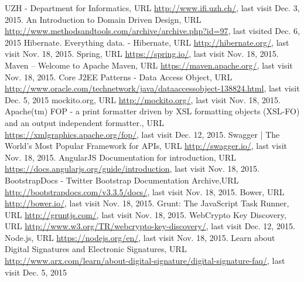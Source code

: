 \begin{thebibliography}{99}

 UZH - Department for Informatics, URL \url{http://www.ifi.uzh.ch/}, last visit Dec. 3, 2015.
 An Introduction to Domain Driven Design, URL \url{http://www.methodsandtools.com/archive/archive.php?id=97}, last visited Dec. 6, 2015
 Hibernate. Everything data. - Hibernate, URL \url{http://hibernate.org/}, last visit Nov. 18, 2015.
 Spring, URL \url{https://spring.io/}, last visit Nov. 18, 2015.
 Maven – Welcome to Apache Maven, URL \url{https://maven.apache.org/}, last visit Nov. 18, 2015.
 Core J2EE Patterns - Data Access Object, URL \url{http://www.oracle.com/technetwork/java/dataaccessobject-138824.html}, last visit Dec. 5, 2015
 mockito.org, URL \url{http://mockito.org/}, last visit Nov. 18, 2015.
 Apache(tm) FOP - a print formatter driven by XSL formatting objects (XSL-FO) and an output independent formatter., URL \url{https://xmlgraphics.apache.org/fop/}, last visit Dec. 12, 2015.
 Swagger | The World's Most Popular Framework for APIs, URL \url{http://swagger.io/}, last visit Nov. 18, 2015.
 AngularJS Documentation for introduction, URL \url{https://docs.angularjs.org/guide/introduction}, last visit Nov. 18, 2015.
 BootstrapDocs - Twitter Bootstrap Documentation Archive,\newline URL \url{http://bootstrapdocs.com/v3.3.5/docs/}, last visit Nov. 18, 2015.
 Bower, URL \url{http://bower.io/}, last visit Nov. 18, 2015.
 Grunt: The JavaScript Task Runner, URL \url{http://gruntjs.com/}, last visit Nov. 18, 2015.
 WebCrypto Key Discovery, URL \url{http://www.w3.org/TR/webcrypto-key-discovery/}, last visit Dec. 12, 2015.
 Node.js, URL \url{https://nodejs.org/en/}, last visit Nov. 18, 2015.
 Learn about Digital Signatures and Electronic Signatures, URL \url{http://www.arx.com/learn/about-digital-signature/digital-signature-faq/}, last visit Dec. 5, 2015 




\end{thebibliography}

